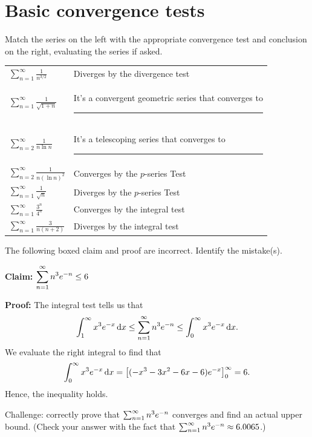\documentclass{discussion}
\author{Sections B04 and B06}
\date{Fall 2024}
\begin{document}
\section{Basic convergence tests}

\begin{question}
    Match the series on the left with the appropriate convergence test and conclusion on the right, evaluating the series if asked.

    \begin{center}
        \setlength{\tabcolsep}{5em}
        \begin{tabularx}{\textwidth}{lX}
            \(\displaystyle \sum_{n=1}^\infty \frac{1}{n^{3/2}}\) & Diverges by the divergence test \\
            \(\displaystyle \sum_{n=1}^\infty \frac{1}{\sqrt{1 + n}}\) & \linespread{1.4}\selectfont  It's a convergent geometric series that converges to \rule{1.5cm}{0.15mm} \\
            \(\displaystyle \sum_{n=2}^\infty \frac{1}{n \ln n}\) & \linespread{1.4}\selectfont  It's a telescoping series that converges to \rule{1.5cm}{0.15mm} \\
            \(\displaystyle \sum_{n=2}^\infty \frac{1}{n (\ln n)^2}\) & Converges by the \(p\)-series Test \\
            \(\displaystyle \sum_{n=1}^\infty \frac{1}{\sqrt{n}}\) & Diverges by the \(p\)-series Test \\
            \(\displaystyle \sum_{n=1}^\infty \frac{3^n}{4^n}\) & Converges by the integral test \\
            \(\displaystyle \sum_{n=1}^\infty \frac{3}{n(n+2)}\) & Diverges by the integral test \\
        \end{tabularx}
    \end{center}
\end{question}

\begin{question}
    The following boxed claim and proof are incorrect.
    Identify the mistake(s).

    \begin{mdframed}
        \textbf{Claim:} \(\displaystyle \sum_{n=1}^\infty n^3 e^{-n} \leq 6\)

        \noindent
        \textbf{Proof:} The integral test tells us that
        \begin{equation*}
            \int_1^\infty x^3 \eu^{-x} \odif{x} \leq \sum_{n=1}^\infty n^3 \eu^{-n} \leq \int_0^\infty x^3 \eu^{-x} \odif{x}.
        \end{equation*}
        We evaluate the right integral to find that
        \begin{equation*}
            \int_0^\infty x^3 \eu^{-x} \odif{x} = \left[ (-x^3 - 3x^2 - 6x - 6) \eu^{-x} \right]_{0}^{\infty} = 6.
        \end{equation*}
        Hence, the inequality holds.
    \end{mdframed}
    Challenge: correctly prove that \(\sum_{n=1}^\infty n^3 e^{-n}\) converges and find an actual upper bound.
    (Check your answer with the fact that \(\sum_{n=1}^\infty n^3 e^{-n} \approx 6.0065\).)
\end{question}
\end{document}
